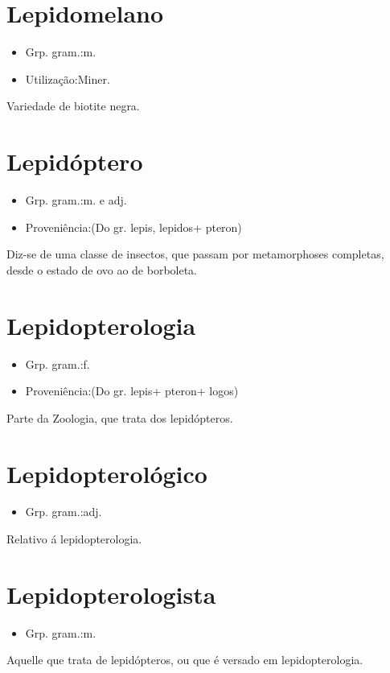 \section{Lepidomelano}
\begin{itemize}
\item {Grp. gram.:m.}
\end{itemize}
\begin{itemize}
\item {Utilização:Miner.}
\end{itemize}
Variedade de biotite negra.
\section{Lepidóptero}
\begin{itemize}
\item {Grp. gram.:m.  e  adj.}
\end{itemize}
\begin{itemize}
\item {Proveniência:(Do gr. \textunderscore lepis\textunderscore , \textunderscore lepidos\textunderscore  + \textunderscore pteron\textunderscore )}
\end{itemize}
Diz-se de uma classe de insectos, que passam por metamorphoses completas, desde o estado de ovo ao de borboleta.
\section{Lepidopterologia}
\begin{itemize}
\item {Grp. gram.:f.}
\end{itemize}
\begin{itemize}
\item {Proveniência:(Do gr. \textunderscore lepis\textunderscore  + \textunderscore pteron\textunderscore  + \textunderscore logos\textunderscore )}
\end{itemize}
Parte da Zoologia, que trata dos lepidópteros.
\section{Lepidopterológico}
\begin{itemize}
\item {Grp. gram.:adj.}
\end{itemize}
Relativo á lepidopterologia.
\section{Lepidopterologista}
\begin{itemize}
\item {Grp. gram.:m.}
\end{itemize}
Aquelle que trata de lepidópteros, ou que é versado em lepidopterologia.
